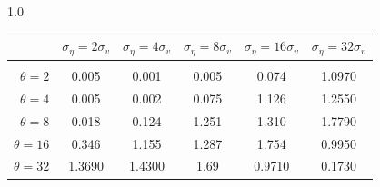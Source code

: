 \documentclass[12pt]{article}
\begin{document}
\begin{table}[h!]
\begin{subtable}{1.0\textwidth}
    \centering
\begin{tabular}{rccccc}
\hline  
            & \multicolumn{1}{l}{$\sigma_{\eta} =2\sigma_{v}$} & \multicolumn{1}{l}{$\sigma_{\eta} =4\sigma_{v}$} & \multicolumn{1}{l}{$\sigma_{\eta} =8\sigma_{v}$} & \multicolumn{1}{l}{$\sigma_{\eta} =16\sigma_{v}$} & \multicolumn{1}{l}{$\sigma_{\eta} =32\sigma_{v}$} \\ \hline  \vspace{-3mm} \\        
$\theta=2$  & 0.005                                             & 0.001                                             & 0.005                                             & 0.074                                              & 1.0970                                             \\ \hline
$\theta=4$  & 0.005                                             & 0.002                                             & 0.075                                             & 1.126                                              & 1.2550                                             \\ \hline
$\theta=8$  & 0.018                                             & 0.124                                             & 1.251                                             & 1.310                                              & 1.7790                                             \\ \hline
$\theta=16$ & 0.346                                             & 1.155                                             & 1.287                                             & 1.754                                              & 0.9950                                             \\ \hline
$\theta=32$ & 1.3690                                            & 1.4300                                            & 1.69                                              & 0.9710                                             & 0.1730                                             \\ \hline
\end{tabular}
\end{subtable}


\end{table}
\end{document}
